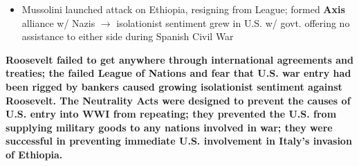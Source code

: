 \documentclass[a4paper]{article}
\begin{document}
{\begin{itemize}
\begin{itemize}
                \item Mussolini launched attack on Ethiopia, resigning from League; formed \textbf{Axis} alliance w/ Nazis $\to$ isolationist sentiment grew in U.S. w/ govt. offering no assistance to either side during Spanish Civil War
            \end{itemize}
        \end{itemize}
        \textbf{Roosevelt failed to get anywhere through international agreements and treaties; the failed League of Nations and fear that U.S. war entry had been rigged by bankers caused growing isolationist sentiment against Roosevelt. The Neutrality Acts were designed to prevent the causes of U.S. entry into WWI from repeating; they prevented the U.S. from supplying military goods to any nations involved in war; they were successful in preventing immediate U.S. involvement in Italy's invasion of Ethiopia.}}
\end{document}
